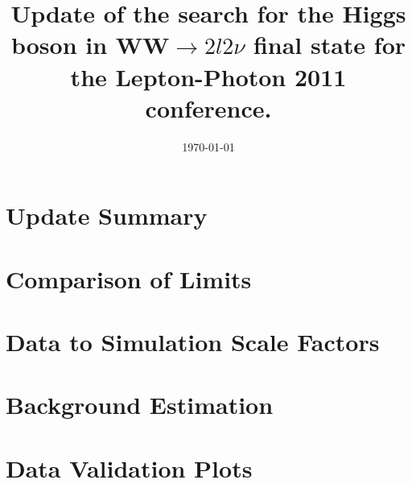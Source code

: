 \documentclass{cmspaper}
\begin{document}
\modulolinenumbers[1]
\date{\today} \title{Update of the search for the Higgs boson in WW$\to2l2\nu$ final state for the Lepton-Photon 2011 conference.}

\maketitle

\clearpage
\tableofcontents
\clearpage

\section{Update Summary}


\appendix

\section{Comparison of Limits}



\section{Data to Simulation Scale Factors}


\section{Background Estimation}
\label{app:lp_bkgestim}


\section{Data Validation Plots}
\label{app:lp_postEPSdist}


\end{document}
